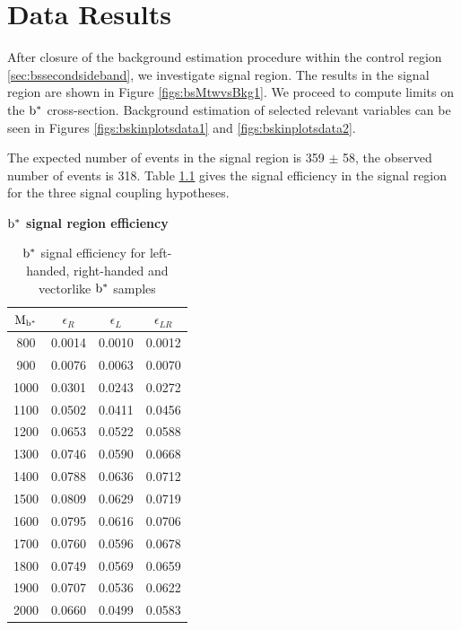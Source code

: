\chapter{Data Results}
After closure of the background estimation procedure within the control region \ref{sec:bssecondsideband}, we investigate signal region.  
The results in the signal region are shown in Figure \ref{figs:bsMtwvsBkg1}.  We proceed to compute 
limits on the $\mathrm{b}^{*}$ cross-section.  Background estimation of selected relevant variables can be seen in 
Figures \ref{figs:bskinplotsdata1} and \ref{figs:bskinplotsdata2}.

The expected number of events in the signal region is 359 $\pm$ 58, the observed number of events is 318.  Table \ref{table:bssigeff} gives the signal efficiency in the signal region for 
the three signal coupling hypotheses.

\begin{table}
\begin{center}
\bf{$\mathrm{b}^{*}$ signal region efficiency}\\
\begin{tabular}{c||c|c|c}
\hline\hline
\bf{$\mathrm{M_{\mathrm{b}^{*}}}$} & \bf{$\epsilon_{R}$}  & \bf{$\epsilon_{L}$} & \bf{$\epsilon_{LR}$} \\
\hline\hline
800 & 0.0014 & 0.0010 & 0.0012\\
900 & 0.0076 & 0.0063 & 0.0070\\
1000 & 0.0301 & 0.0243 & 0.0272\\
1100 & 0.0502 & 0.0411 & 0.0456\\
1200 & 0.0653 & 0.0522 & 0.0588\\
1300 & 0.0746 & 0.0590 & 0.0668\\
1400 & 0.0788 & 0.0636 & 0.0712\\
1500 & 0.0809 & 0.0629 & 0.0719\\
1600 & 0.0795 & 0.0616 & 0.0706\\
1700 & 0.0760 & 0.0596 & 0.0678\\
1800 & 0.0749 & 0.0569 & 0.0659\\
1900 & 0.0707 & 0.0536 & 0.0622\\
2000 & 0.0660 & 0.0499 & 0.0583\\
\hline
\end{tabular}
\end{center}
\caption{$\mathrm{b}^{*}$ signal efficiency for left-handed, right-handed and vectorlike $\mathrm{b}^{*}$ samples}
\label{table:bssigeff}
\end{table}





